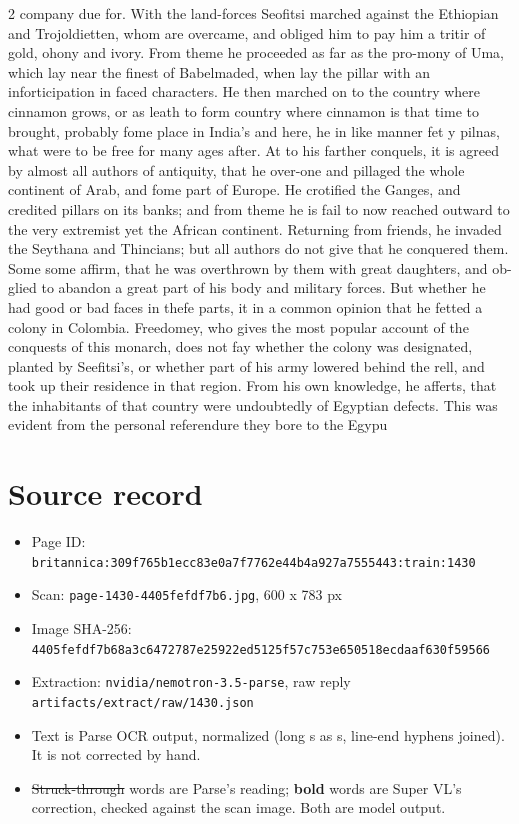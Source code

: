 \documentclass[10pt]{article}
\begin{document}
\begin{multicols}{2}
company due for. With the land-forces Seofitsi marched against the Ethiopian and Trojoldietten, whom are overcame, and obliged him to pay him a tritir of gold, ohony and ivory. From theme he proceeded as far as the pro-mony of Uma, which lay near the finest of Babelmaded, when lay the pillar with an inforticipation in faced characters. He then marched on to the country where cinnamon grows, or as leath to form country where cinnamon is that time to brought, probably fome place in India’s and here, he in like manner fet y pilnas, what were to be free for many ages after. At to his farther conquels, it is agreed by almost all authors of antiquity, that he over-one and pillaged the whole continent of Arab, and fome part of Europe. He crotified the Ganges, and credited pillars on its banks; and from theme he is fail to now reached outward to the very extremist yet the African continent. Returning from friends, he invaded the Seythana and Thincians; but all authors do not give that he conquered them. Some some affirm, that he was overthrown by them with great daughters, and ob-glied to abandon a great part of his body and military forces. But whether he had good or bad faces in thefe parts, it in a common opinion that he fetted a colony in Colombia. Freedomey, who gives the most popular account of the conquests of this monarch, does not fay whether the colony was designated, planted by Seefitsi's, or whether part of his army lowered behind the rell, and took up their residence in that region. From his own knowledge, he afferts, that the inhabitants of that country were undoubtedly of Egyptian defects. This was evident from the personal referendure they bore to the Egypu
\end{multicols}
\section*{Source record}
\begin{itemize}
\item Page ID: \texttt{britannica:309f765b1ecc83e0a7f7762e44b4a927a7555443:train:1430}
\item Scan: \texttt{page-1430-4405fefdf7b6.jpg}, 600 x 783 px
\item Image SHA-256: \texttt{\small 4405fefdf7b68a3c6472787e25922ed5125f57c753e650518ecdaaf630f59566}
\item Extraction: \texttt{nvidia/nemotron-3.5-parse}, raw reply \texttt{artifacts/extract/raw/1430.json}
\item Text is Parse OCR output, normalized (long s as s, line-end hyphens joined). It is not corrected by hand.
\item \sout{Struck-through} words are Parse's reading; \textbf{bold} words are Super VL's correction, checked against the scan image. Both are model output.
\end{itemize}
\end{document}

